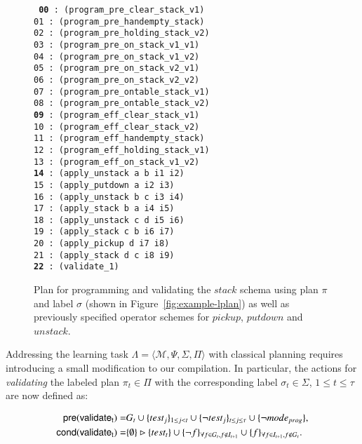 \documentclass[3p,times]{elsarticle}
\newcommand{\pre}{\mathsf{pre}}  %
\newcommand{\cond}{\mathsf{cond}}   %
\newcommand{\tup}[1]{{\langle #1 \rangle}}
\begin{document}
\begin{figure}[hbt!]
{\footnotesize\tt
     {\bf 00} : (program\_pre\_clear\_stack\_v1)\\
     01 : (program\_pre\_handempty\_stack)\\
     02 : (program\_pre\_holding\_stack\_v2)\\
     03 : (program\_pre\_on\_stack\_v1\_v1)\\
     04 : (program\_pre\_on\_stack\_v1\_v2)\\
     05 : (program\_pre\_on\_stack\_v2\_v1)\\
     06 : (program\_pre\_on\_stack\_v2\_v2)\\
     07 : (program\_pre\_ontable\_stack\_v1)\\
     08 : (program\_pre\_ontable\_stack\_v2)\\
     {\bf 09} : (program\_eff\_clear\_stack\_v1)\\
    10 : (program\_eff\_clear\_stack\_v2)\\
    11 : (program\_eff\_handempty\_stack)\\
    12 : (program\_eff\_holding\_stack\_v1)\\
    13 : (program\_eff\_on\_stack\_v1\_v2)\\
    {\bf 14} : (apply\_unstack a b i1 i2)\\
    15 : (apply\_putdown a i2 i3)\\
    16 : (apply\_unstack b c i3 i4)\\
    17 : (apply\_stack b a i4 i5)\\
    18 : (apply\_unstack c d i5 i6)\\
    19 : (apply\_stack c b i6 i7)\\
    20 : (apply\_pickup d i7 i8)\\
    21 : (apply\_stack d c i8 i9)\\
    {\bf 22} : (validate\_1)
}
 \caption{\small Plan for programming and validating the $stack$ schema using plan $\pi$ and label $\sigma$ (shown in Figure~\ref{fig:example-lplan}) as well as previously specified operator schemes for $pickup$, $putdown$ and $unstack$.}
\label{fig:plan-lplan}
\end{figure}

Addressing the learning task $\Lambda=\tup{\mathcal{M},\Psi,\Sigma,\Pi}$ with classical planning requires introducing a small modification to our compilation. In particular, the actions for {\em validating} the labeled plan $\pi_t\in\Pi$ with the corresponding label $\sigma_t\in\Sigma$, {\tt\small $1\leq t\leq \tau$} are now defined as:
\begin{small}
\begin{align*}
\hspace*{7pt}\pre(\mathsf{validate_{t}})=&G_t\cup\{test_j\}_{1\leq j<t}\cup\{\neg test_j\}_{t\leq j\leq \tau}\cup \{\neg mode_{prog}\},\\
\cond(\mathsf{validate_{t}})=&\{\emptyset\}\rhd\{test_t\} \cup \{\neg f\}_{\forall f\in G_t, f \notin I_{t+1}}\cup \{f\}_{\forall f\in I_{t+1}, f \notin G_t}.
\end{align*}
\end{small}
\end{document}

